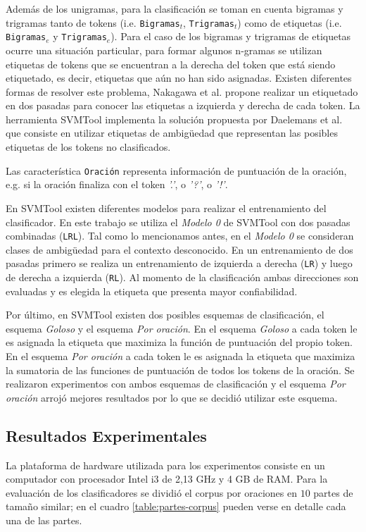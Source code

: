 \documentclass[runningheads,a4paper]{llncs}
\begin{document}
Adem\'as de los unigramas, para la clasificaci\'on se toman en cuenta bigramas y trigramas tanto de tokens (i.e. \texttt{\small Bigramas$_{t}$}, \texttt{\small Trigramas$_{t}$}) como de etiquetas (i.e. \texttt{\small Bigramas$_{e}$} y \texttt{\small Trigramas$_{e}$}). Para el caso de los bigramas y trigramas de etiquetas ocurre una situaci\'on particular, para formar algunos n-gramas se utilizan etiquetas de tokens que se encuentran a la derecha del token que está siendo etiquetado, es decir, etiquetas que aún no han sido asignadas. Existen diferentes formas de resolver este problema, Nakagawa et al.\cite{NAKAGAWA01} propone realizar un etiquetado en dos pasadas para conocer las etiquetas a izquierda y derecha de cada token. La herramienta SVMTool implementa la solución propuesta por Daelemans et al.\cite{DAELEMANS96} que consiste en utilizar etiquetas de ambig\"uedad que representan las posibles etiquetas de los tokens no clasificados.

Las caracter\'istica \texttt{\small Oraci\'on} representa información de puntuación de la oración, e.g. si la oración finaliza con el token \emph{'.'}, o \emph{'?'}, o \emph{'!'}.

En SVMTool existen diferentes modelos para realizar el entrenamiento del clasificador. En este trabajo se utiliza el \emph{Modelo 0} de SVMTool con dos pasadas combinadas (\texttt{\small LRL}). Tal como lo mencionamos antes, en el \emph{Modelo 0} se consideran clases de ambig\"uedad para el contexto desconocido. En un entrenamiento de dos pasadas primero se realiza un entrenamiento de izquierda a derecha (\texttt{\small LR}) y luego de derecha a izquierda (\texttt{\small RL}). Al momento de la clasificación ambas direcciones son evaluadas y es elegida la etiqueta que presenta mayor confiabilidad.

Por último, en SVMTool existen dos posibles esquemas de clasificación, el esquema \emph{Goloso} y el esquema \emph{Por oración}. En el esquema \emph{Goloso} a cada token le es asignada la etiqueta que maximiza la función de puntuación del propio token. En el esquema \emph{Por oración} a cada token le es asignada la etiqueta que maximiza la sumatoria de las funciones de puntuación de todos los tokens de la oración. Se realizaron experimentos con ambos esquemas de clasificación y el esquema \emph{Por oración} arrojó mejores resultados por lo que se decidió utilizar este esquema.

\subsection{Resultados Experimentales}
La plataforma de hardware utilizada para los experimentos consiste en un computador con procesador Intel i3 de 2,13 GHz y 4 GB de RAM. Para la evaluación de los clasificadores se dividió el corpus por oraciones en $10$ partes de tamaño similar; en el cuadro \ref{table:partes-corpus} pueden verse en detalle cada una de las partes. 
\end{document}
